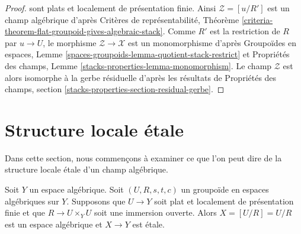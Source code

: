\begin{proof}
sont plats et localement de présentation finie. Ainsi
$\mathcal{Z} = [u/R']$ est un champ algébrique d'après Critères de
représentabilité, Théorème
\ref{criteria-theorem-flat-groupoid-gives-algebraic-stack}.
Comme $R'$ est la restriction de $R$ par $u \to U$, le morphisme
$\mathcal{Z} \to \mathcal{X}$ est un monomorphisme d'après Groupoïdes en
espaces, Lemme
\ref{spaces-groupoids-lemma-quotient-stack-restrict}
et Propriétés des champs, Lemme
\ref{stacks-properties-lemma-monomorphism}.
Le champ $\mathcal{Z}$ est alors isomorphe à la gerbe résiduelle d'après les
résultats de Propriétés des champs, section
\ref{stacks-properties-section-residual-gerbe}.
\end{proof}













\section{Structure locale \'etale}
\label{section-etale-local}

\noindent
Dans cette section, nous commen\c{c}ons \`a examiner ce que l'on peut dire
de la structure locale \'etale d'un champ alg\'ebrique.

\begin{lemma}
\label{lemma-quotient-etale}
Soit $Y$ un espace alg\'ebrique.
Soit $(U, R, s, t, c)$ un groupo\"ide en espaces alg\'ebriques sur $Y$.
Supposons que $U \to Y$ soit plat et localement de pr\'esentation finie
et que $R \to U \times_Y U$ soit une immersion ouverte.
Alors $X = [U/R] = U/R$ est un espace alg\'ebrique et $X \to Y$
est \'etale.
\end{lemma}

